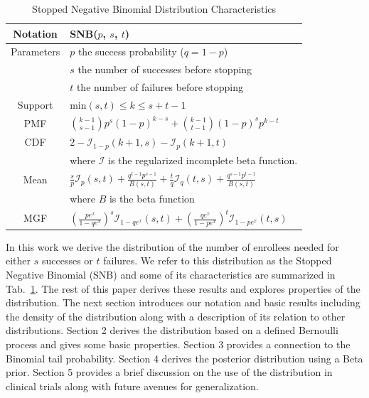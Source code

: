 \documentclass[review]{elsarticle}
\begin{document}
\begin{table}[t!]
\caption{Stopped Negative Binomial Distribution Characteristics}
\label{tab:snb}
\begin{center}
\begin{tabular}{|c|l|} \hline
Notation & SNB($p$, $s$, $t$) \\ \hline
Parameters & $p$ the success probability ($q = 1-p$) \\
           & $s$ the number of successes before stopping \\
           & $t$ the number of failures before stopping \\ \hline
Support & min$(s,t) \leq k \leq s+t-1$  \\ \hline
PMF & ${k-1 \choose s-1} p^s (1-p)^{k-s} + {k-1 \choose t-1} (1-p)^s p^{k-t}$\\ \hline
CDF & $2 - \mathcal{I}_{1-p}(k+1, s) - \mathcal{I}_{p}(k+1, t)$\\ 
    & where $\mathcal{I}$ is the regularized incomplete beta function.\\ \hline
Mean & $\frac{s}{p} \mathcal{I}_p(s,t) + \frac{q^{t-1} p^{s-1}}{B(s,t)} +
  \frac{t}{q} \mathcal{I}_q(t,s) + \frac{q^{s-1}p^{t-1}}{B(s,t)}$\\ 
  & where $B$ is the beta function \\ \hline
MGF & $\left(\frac{p e^x}{1 - qe^x}\right)^s 
  \mathcal{I}_{1-qe^x} (s, t) + \left(\frac{qe^x}{1-pe^x}\right)^t 
  \mathcal{I}_{1-pe^x}(t, s) $\\ \hline
\end{tabular}
\end{center}
\end{table}

In this work we derive the distribution of the number of enrollees needed
for either $s$ successes or $t$ failures. We refer to this distribution
as the Stopped Negative Binomial (SNB) and some of its characteristics are
summarized in Tab.~\ref{tab:snb}.
The rest of this paper derives these results
and explores properties of the distribution.
The next section introduces our notation and basic results
including the density of the distribution along with a description of
its relation to other distributions. Section 2 derives the distribution
based on a defined Bernoulli process and gives some basic properties.
Section 3 provides a connection to the Binomial tail probability.
Section 4 derives the posterior distribution using a Beta prior.
Section 5 provides a brief discussion on the use of the distribution
in clinical trials along with future avenues for generalization.
\end{document}
